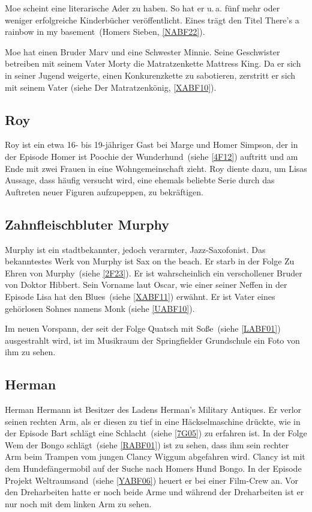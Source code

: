 {Moe scheint eine literarische Ader zu haben. So hat er u.\,a. fünf mehr oder weniger erfolgreiche Kinderbücher veröffentlicht. Eines trägt den Titel \glqq There's a rainbow in my basement\grqq\ (\glqq Homers Sieben\grqq , \ref{NABF22}).

Moe hat einen Bruder Marv und eine Schwester Minnie. Seine Geschwister betreiben mit seinem Vater Morty die Matratzenkette \glqq Mattress King\grqq. Da er sich in seiner Jugend weigerte, einen Konkurenzkette zu sabotieren, zerstritt er sich mit seinem Vater (siehe \glqq Der Matratzenkönig\grqq, \ref{XABF10}).

\subsection{Roy}
Roy ist ein etwa 16- bis 19-jähriger Gast bei Marge und Homer Simpson, der in der Episode \glqq Homer ist \glq Poochie der Wunderhund\grq \grqq\ (siehe \ref{4F12}) auftritt und am Ende mit zwei Frauen in eine Wohngemeinschaft zieht. Roy diente dazu, um Lisas Aussage, dass häufig versucht wird, eine ehemals beliebte Serie durch das Auftreten neuer Figuren aufzupeppen, zu bekräftigen.

\subsection{Zahnfleischbluter Murphy}\label{ZahnfleischbluterMurphy}
Murphy ist ein stadtbekannter, jedoch verarmter, Jazz-Saxofonist. Das bekanntestes Werk von Murphy ist \glqq Sax on the beach\grqq . Er starb in der Folge \glqq Zu Ehren von Murphy\grqq\ (siehe \ref{2F23}). Er ist wahrscheinlich ein verschollener Bruder von Doktor Hibbert. Sein Vorname laut Oscar, wie einer seiner Neffen in der Episode \glqq Lisa hat den Blues\grqq\ (siehe \ref{XABF11}) erwähnt. Er ist Vater eines gehörlosen Sohnes namens Monk (siehe \ref{UABF10}).

Im neuen Vorspann, der seit der Folge \glqq Quatsch mit Soße\grqq\ (siehe \ref{LABF01}) ausgestrahlt wird, ist im Musikraum der Springfielder Grundschule ein Foto von ihm zu sehen.


\subsection{Herman}\label{HermanHermann}
Herman Hermann ist Besitzer des Ladens \glqq Herman's Military Antiques\grqq . Er verlor seinen rechten Arm, als er diesen zu tief in eine Häckselmaschine drückte, wie in der Episode \glqq Bart schlägt eine Schlacht\grqq\ (siehe \ref{7G05}) zu erfahren ist. In der Folge \glqq Wem der Bongo schlägt\grqq\ (siehe \ref{RABF01}) ist zu sehen, dass ihm sein rechter Arm beim Trampen vom jungen Clancy Wiggum abgefahren wird. Clancy ist mit dem Hundefängermobil auf der Suche nach Homers Hund Bongo. In der Episode \glqq Projekt Weltraumsand\grqq\ (siehe \ref{YABF06}) heuert er bei einer Film-Crew an. Vor den Dreharbeiten hatte er noch beide Arme und während der Dreharbeiten ist er nur noch mit dem linken Arm zu sehen.

}
